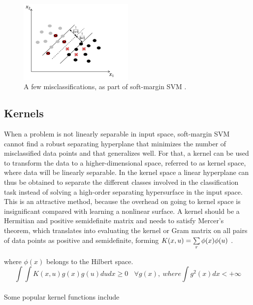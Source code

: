\begin{figure}[H]
\centering
\includegraphics[width=0.5\textwidth]{img/softmargin.PNG}
\caption{  A few misclassifications, as part of soft-margin SVM . }
\label{126 }
\end{figure}


\subsection{Kernels}

When a problem is not linearly separable in input space, soft-margin SVM cannot find a robust separating
hyperplane that minimizes the number of misclassified data points and that generalizes well. For that, a kernel can be used to transform the data to a higher-dimensional space, referred to as kernel space, where data will be linearly separable. In the kernel space a linear hyperplane can thus be obtained to separate the different classes involved in the classification task instead of solving a high-order separating hypersurface in the input space. This is an attractive method, because the overhead on going to kernel space is insignificant compared with learning a nonlinear surface. A kernel should be a Hermitian and positive semidefinite matrix and needs to satisfy Mercer’s theorem, which translates into evaluating the kernel or Gram matrix on all pairs of data points as positive and semidefinite, forming
\newline 
\newline
$K(\small{x,u})=\sum\limits_{r} \phi(x)\phi(u) $ .

where $\phi(x) $ belongs to the Hilbert space.
\newline
$$\int \int K(x,u) g(x) g(u) du dx \geq 0 \ \ \ \ \forall g(x) , \ where \int g^2(x) dx < +\infty$$
\\
\newline 
Some popular kernel functions include
\newline
\newline


